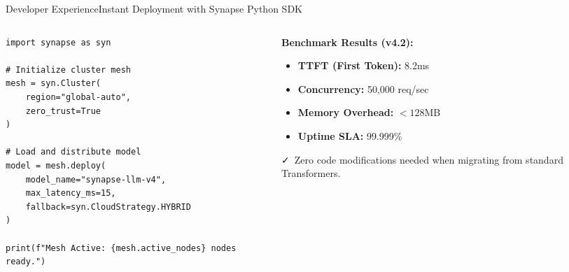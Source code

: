 \documentclass[aspectratio=169,10pt]{beamer}
\begin{document}
\begin{frame}[fragile]{Developer Experience}{Instant Deployment with Synapse Python SDK}
  \begin{columns}[T]
    \begin{column}{0.54\textwidth}
      \begin{lstlisting}[style=synapsecode, caption={deploy\_service.py}]
import synapse as syn

# Initialize cluster mesh
mesh = syn.Cluster(
    region="global-auto",
    zero_trust=True
)

# Load and distribute model
model = mesh.deploy(
    model_name="synapse-llm-v4",
    max_latency_ms=15,
    fallback=syn.CloudStrategy.HYBRID
)

print(f"Mesh Active: {mesh.active_nodes} nodes ready.")
      \end{lstlisting}
    \end{column}
    
    \begin{column}{0.42\textwidth}
      \begin{tcolorbox}[purplecard, title={\small\faTerminal\ Performance Metrics}]
        \scriptsize
        \textbf{Benchmark Results (v4.2):}
        \vspace*{0.15cm}
        \begin{itemize}
          \item \textbf{TTFT (First Token):} 8.2ms
          \item \textbf{Concurrency:} 50,000 req/sec
          \item \textbf{Memory Overhead:} $< 128$MB
          \item \textbf{Uptime SLA:} 99.999\%
        \end{itemize}
        \vspace*{0.2cm}
        {\color{emeralds}\faCheck\ Zero code modifications needed when migrating from standard Transformers.}
      \end{tcolorbox}
    \end{column}
  \end{columns}
\end{frame}
\end{document}
